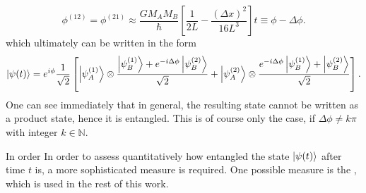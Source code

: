 \begin{equation}\label{eq:2:definition-delta-phi}
  \phi^{(12)} = \phi^{(21)} \approx \frac{GM_AM_B}{\hbar} \left[ \frac{1}{2L} - \frac{(\Delta x)^2}{16 L^3} \right] t \equiv \phi - \Delta\phi .
\end{equation}
which ultimately can be written in the form
\begin{equation}\label{eq:2:evolved-state-factored}
  \ket{\psi(t)} = e^{i\phi}\frac{1}{\sqrt{2}}\left[ 
    \ket{\psi_A^{(1)}} \otimes \frac{\ket{\psi_B^{(1)}} + e^{-i\Delta\phi} \ket{\psi_B^{(2)}}}{\sqrt{2}}
    + \ket{\psi_A^{(2)}} \otimes \frac{e^{-i\Delta\phi} \ket{\psi_B^{(1)}} + \ket{\psi_B^{(2)}}}{\sqrt{2}} \right] .
\end{equation}
One can see immediately that in general, the resulting state cannot be written as a product state, hence it is entangled.
This is of course only the case, if $\Delta \phi \neq k\pi$ with integer $k\in \mathbb{N}$.

In order 
In order to assess quantitatively how entangled the state $\ket{\psi(t)}$ after time $t$ is, a more sophisticated measure is required. 
One possible measure is the , which is used in the rest of this work.